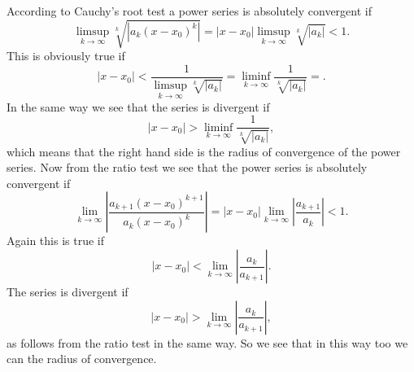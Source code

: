 \documentclass[12pt]{article}
\begin{document}
According to Cauchy's root test a power series is absolutely convergent if
$$\limsup_{k\to\infty}\sqrt[k]{|a_k(x-x_0)^k|}=|x-x_0|\limsup_{k\to\infty}\sqrt[k]{|a_k|}<1.$$
This is obviously true if
$$|x-x_0|<\frac{1}{\limsup_{k\to\infty}\sqrt[k]{|a_k|}}=\liminf_{k\to\infty}\frac{1}{\sqrt[k]{|a_k|}}=.$$
In the same way we see that the series is divergent if
$$|x-x_0|>\liminf_{k\to\infty}\frac{1}{\sqrt[k]{|a_k|}},$$
which means that the right hand side is the radius of convergence of the power series.
Now from the ratio test we see that the power series is absolutely convergent if
$$\lim_{k\to\infty}\left|\frac{a_{k+1}(x-x_0)^{k+1}}{a_k(x-x_0)^k}\right|=|x-x_0| \lim_{k\to\infty}\left|\frac{a_{k+1}}{a_k}\right|<1.$$
Again this is true if
$$|x-x_0|<\lim_{k\to\infty}\left|\frac{a_k}{a_{k+1}}\right|.$$
The series is divergent if
$$|x-x_0|>\lim_{k\to\infty}\left|\frac{a_k}{a_{k+1}}\right|,$$
as follows from the ratio test in the same way. So we see that in this way too we can  the radius of convergence.
\end{document}
